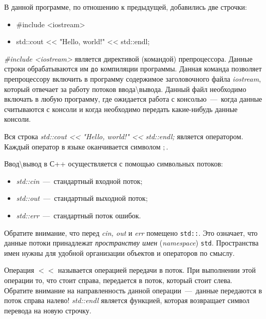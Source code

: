 В данной программе, по отношению к предыдущей, добавились две строчки:

\begin{itemize}
    \item \#include <iostream>
    \item std::cout << "Hello, world!" << std::endl;
\end{itemize}

\textit{\#include <iostream>} является директивой (командой) препроцессора. Данные строки обрабатываются им \texttt{до} компиляции программы. Данная команда позволяет препроцессору включить в программу содержимое заголовочного файла \textit{iostream}, который отвечает за работу потоков ввода\textbackslash вывода. Данный файл необходимо включать в любую программу, где ожидается работа с консолью~---~когда данные считываются с консоли и когда необходимо передать какие-нибудь данные консоли.

Вся строка \textit{std::cout << "Hello, world!" << std::endl;} является оператором. Каждый оператор в языке оканчивается символом $;$.

Ввод\textbackslash вывод в С++ осуществляется с помощью символьных потоков: 
\begin{itemize}
    \item \textit{std::cin}~---~стандартный входной поток;
    \item \textit{std::out}~---~стандартный выходной поток;
    \item \textit{std::err}~---~стандартный поток ошибок.
\end{itemize} 

Обратите внимание, что перед \textit{cin, out} и \textit{err} помещено \texttt{std::}. Это означает, что данные потоки принадлежат \textit{пространству имен} (\textit{namespace}) \texttt{std}. Пространства имен нужны для удобной организации объектов и операторов по смыслу.

Операция $<<$ называется $\textit{операцией передачи в поток}$. При выполнении этой операции то, что стоит справа, передается в поток, который стоит слева. Обратите внимание на направленность данной операции~---~данные передаются в поток справа налево! \textit{std::endl} является функцией, которая возвращает символ перевода на новую строчку.

